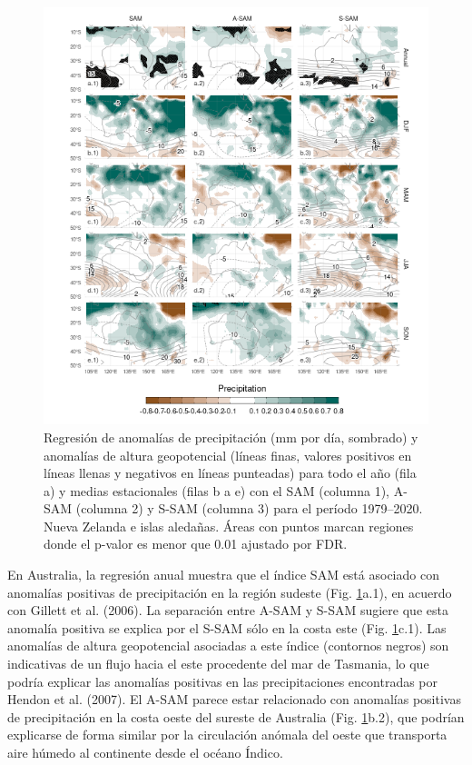 \documentclass[12pt,oneside]{reedthesis}
\begin{document}
\begin{figure}
\includegraphics{figures/30-sam/pp-regr-oceania-1} \caption{Regresión de anomalías de precipitación (mm por día, sombrado) y anomalías de altura geopotencial (líneas finas, valores positivos en líneas llenas y negativos en líneas punteadas) para todo el año (fila a) y medias estacionales (filas b a e) con el SAM (columna 1), A-SAM (columna 2) y S-SAM (columna 3) para el período 1979--2020. Nueva Zelanda e islas aledañas. Áreas con puntos marcan regiones donde el p-valor es menor que 0.01 ajustado por FDR.}\label{fig:pp-regr-oceania}
\end{figure}

En Australia, la regresión anual muestra que el índice SAM está asociado con anomalías positivas de precipitación en la región sudeste (Fig. \ref{fig:pp-regr-oceania}a.1), en acuerdo con Gillett et al. (2006).
La separación entre A-SAM y S-SAM sugiere que esta anomalía positiva se explica por el S-SAM sólo en la costa este (Fig. \ref{fig:pp-regr-oceania}c.1).
Las anomalías de altura geopotencial asociadas a este índice (contornos negros) son indicativas de un flujo hacia el este procedente del mar de Tasmania, lo que podría explicar las anomalías positivas en las precipitaciones encontradas por Hendon et al. (2007).
El A-SAM parece estar relacionado con anomalías positivas de precipitación en la costa oeste del sureste de Australia (Fig. \ref{fig:pp-regr-oceania}b.2), que podrían explicarse de forma similar por la circulación anómala del oeste que transporta aire húmedo al continente desde el océano Índico.
\end{document}
